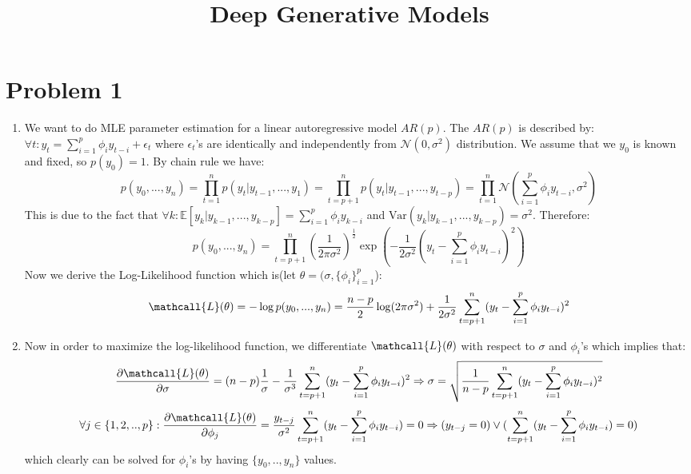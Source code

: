 \documentclass{article}
\title{Deep Generative Models \par \exerciseset}
\author{\SecondAuther }
\begin{document}
\maketitle


\section*{Problem 1}
\begin{enumerate}
    \item  We want to do MLE parameter estimation for a linear autoregressive model $AR(p)$. The  $AR(p)$ is described by: $\forall t: y_t = \sum_{i=1}^p \phi_{i} y_{t-i} + \epsilon_t$ where $\epsilon_t$'s are identically and independently from $\mathcal{N}(0, \sigma^2)$ distribution. We assume that we $y_0$ is known and fixed, so $p(y_0)=1$. By chain  rule we have:
    \begin{equation*}
        p(y_0, ..., y_n)= \prod_{t=1}^n p(y_t | y_{t-1}, ..., y_1) = \prod_{t=p+1}^n p(y_t | y_{t-1}, ..., y_{t-p}) =\prod_{t=1}^{n} \mathcal{N}(\sum_{i=1}^p \phi_{i} y_{t-i} , \sigma^2)
    \end{equation*}    
    This is due to the fact that $\forall k: \mathbb{E} [y_k | y_{k-1} , ... , y_{k-p}] =  \sum_{i=1}^p \phi_{i} y_{k-i}$ and $\text{Var}(y_k | y_{k-1} , ... , y_{k-p}) = \sigma^2$. Therefore:
    \begin{equation*}
        p(y_0, ..., y_n)= \prod_{t=p+1}^n (\frac{1}{2\pi \sigma^2})^{\frac{1}{2}} \exp{(-\frac{1}{2 \sigma^2} (y_t - \sum_{i=1}^p \phi_{i} y_{t-i})^2 )}
    \end{equation*}    
    Now we derive the Log-Likelihood function which is(let $\theta = (\sigma, \{\phi_{i}\}_{i=1}^{p}$):
    \begin{equation*}
        \mathcall{L}(\theta) = -\log p(y_0, ..., y_n) = \frac{n-p}{2} \log(2\pi \sigma^2)  + \frac{1}{2 \sigma^2}\sum_{t=p+1}^{n}  (y_t - \sum_{i=1}^p \phi_{i} y_{t-i})^2 
    \end{equation*}  
    \item  Now in order to maximize the log-likelihood function, we differentiate $\mathcall{L}(\theta)$ with respect to $\sigma$ and $\phi_i$'s which  implies that:
    \begin{equation*}
        \frac{\partial \mathcall{L}(\theta)}{\partial \sigma} = (n-p) \frac{1}{\sigma} - \frac{1}{\sigma^3} \sum_{t=p+1}^{n}  (y_t - \sum_{i=1}^p \phi_{i} y_{t-i})^2 \Rightarrow \sigma = \sqrt{ \frac{1}{n-p} \sum_{t=p+1}^{n}  (y_t - \sum_{i=1}^p \phi_{i} y_{t-i})^2 }
    \end{equation*}
    \begin{equation*}
        \forall j \in \{1,2,..,p\}: \frac{\partial \mathcall{L}(\theta)}{\partial \phi_j} = \frac{ y_{t-j}}{\sigma^2} \sum_{t=p+1}^{n}  (y_t - \sum_{i=1}^p \phi_{i} y_{t-i}) = 0 \Rightarrow (y_{t-j} = 0) \lor ( \sum_{t=p+1}^{n}  (y_t - \sum_{i=1}^p \phi_{i} y_{t-i}) = 0)
    \end{equation*} 
    which clearly can be solved for $\phi_i$'s by having $\{y_0,..,y_n\}$ values.
\end{enumerate}
\end{document}
